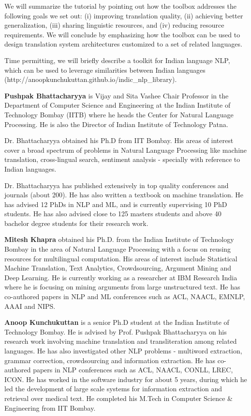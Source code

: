 \begin{tutorial}
We will summarize the tutorial by pointing out how the toolbox addresses the following goals we set out: (i) improving translation quality, (ii) achieving better generalization, (iii) sharing linguistic resources, and (iv) reducing resource requirements. We will conclude by emphasizing how the toolbox can be used to design translation system architectures customized to a set of related languages.

Time permitting, we will briefly describe a toolkit for Indian language NLP, which can be used to leverage similarities between Indian languages (http://anoopkunchukuttan.github.io/indic\_nlp\_library).

\end{tutorial} 

\begin{bio}
  {\bfseries Pushpak Bhattacharyya} is Vijay and Sita Vashee Chair Professor in the Department of Computer Science and Engineering at the Indian Institute of Technology Bombay (IITB) where he heads the Center for Natural Language Processing. He is also the Director of Indian Institute of Technology Patna.

  Dr. Bhattacharyya obtained his Ph.D from IIT Bombay. His areas of interest cover a broad spectrum of problems in Natural Language Processing like machine translation, cross-lingual search, sentiment analysis - specially with reference to Indian languages.

  Dr. Bhattacharyya has published extensively in top quality conferences and journals (about 200). He has also written a textbook on machine translation. He has advised 12 PhDs in NLP and ML, and is currently supervising 10 PhD students. He has also advised close to 125 masters students and above 40 bachelor degree students for their research work.

  {\bfseries Mitesh Khapra} obtained his Ph.D. from the Indian Institute of Technology Bombay in the area of Natural Language Processing with a focus on reusing resources for multilingual computation. His areas of interest include Statistical Machine Translation, Text Analytics, Crowdsourcing, Argument Mining and Deep Learning. He is currently working as a researcher at IBM Research India where he is focusing on mining arguments from large unstructured text. He has co-authored papers in NLP and ML conferences such as ACL, NAACL, EMNLP, AAAI and NIPS. 

  {\bfseries Anoop Kunchukuttan} is a senior Ph.D student at the Indian Institute of Technology Bombay. He is advised by Prof. Pushpak Bhattacharyya on his research work involving machine translation and transliteration among related languages. He has also investigated other NLP problems - multiword extraction, grammar correction, crowdsourcing and information extraction. He has co-authored papers in NLP conferences such as ACL, NAACL, CONLL, LREC, ICON. He has worked in the software industry for about 5 years, during which he led the development of large scale systems for information extraction and retrieval over medical text. He completed his M.Tech in Computer Science \& Engineering from IIT Bombay. 
\end{bio}



